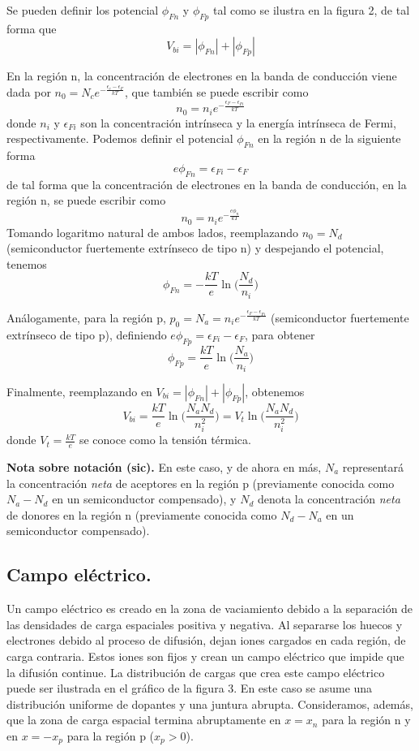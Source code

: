 \documentclass[12pt,a4paper]{article}
\begin{document}
Se pueden definir los potencial $\phi _{Fn}$ y $\phi _{Fp}$ tal como se ilustra en la figura 2, de tal forma que
\[ V_{bi}=|\phi _{Fn}| + |\phi _{Fp}| \]

En la región n, la concentración de electrones en la banda de conducción viene dada por $n_{0}=N_{c}e^{-\frac{\epsilon _{c} - \epsilon _{F}}{kT}}$, que también se puede escribir como
\[ n_{0}=n_{i}e^{-\frac{\epsilon _{F} - \epsilon _{Fi}}{kT}} \]
donde $n_{i}$ y $\epsilon _{Fi}$ son la concentración intrínseca y la energía intrínseca de Fermi, respectivamente. Podemos definir el potencial $\phi _{Fn}$ en la región n de la siguiente forma
\[ e\phi _{Fn} = \epsilon _{Fi} - \epsilon _{F} \]
de tal forma que la concentración de electrones en la banda de conducción, en la región n, se puede escribir como
\[ n_{0}=n_{i}e^{-\frac{e\phi _{n}}{kT}} \]
Tomando logaritmo natural de ambos lados, reemplazando $n_{0}=N_{d}$ (semiconductor fuertemente extrínseco de tipo n) y despejando el potencial, tenemos
\[ \phi _{Fn} = -\frac{kT}{e} \ln \bigg( \frac{N_{d}}{n_{i}} \bigg) \]

Análogamente, para la región p, $p_{0}=N_{a}=n_{i}e^{-\frac{\epsilon _{F} - \epsilon _{Fi}}{kT}}$ (semiconductor fuertemente extrínseco de tipo p), definiendo $e\phi _{Fp}=\epsilon _{Fi} - \epsilon _{F}$, para obtener
\[ \phi _{Fp} = \frac{kT}{e} \ln \bigg( \frac{N_{a}}{n_{i}} \bigg) \]

Finalmente, reemplazando en $V_{bi}=|\phi _{Fn}| + |\phi _{Fp}|$, obtenemos
\[ V_{bi} = \frac{kT}{e} \ln \bigg( \frac{N_{a}N_{d}}{n_{i}^{2}} \bigg) = V_{t} \ln \bigg( \frac{N_{a}N_{d}}{n_{i}^{2}} \bigg) \]
donde $V_{t}=\frac{kT}{e}$ se conoce como la tensión térmica.

\textbf{Nota sobre notación (sic).} En este caso, y de ahora en más, $N_{a}$ representará la concentración \emph{neta} de aceptores en la región p (previamente conocida como $N_{a} - N_{d}$ en un semiconductor compensado), y $N_{d}$ denota la concentración \emph{neta} de donores en la región n (previamente conocida como $N_{d} - N_{a}$ en un semiconductor compensado).

\subsection{Campo eléctrico.}

Un campo eléctrico es creado en la zona de vaciamiento debido a la separación de las densidades de carga espaciales positiva y negativa. Al separarse los huecos y electrones debido al proceso de difusión, dejan iones cargados en cada región, de carga contraria. Estos iones son fijos y crean un campo eléctrico que impide que la difusión continue. La distribución de cargas que crea este campo eléctrico puede ser ilustrada en el gráfico de la figura 3. En este caso se asume una distribución uniforme de dopantes y una juntura abrupta. Consideramos, además, que la zona de carga espacial termina abruptamente en $x=x_{n}$ para la región n y en $x=-x_{p}$ para la región p ($x_{p}>0$).
\end{document}
